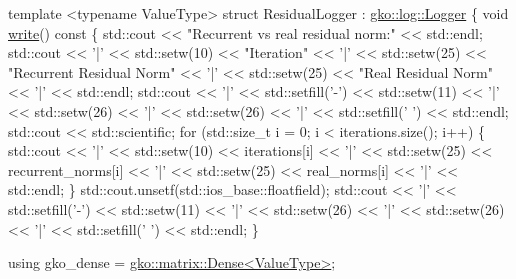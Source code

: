 \begin{DoxyCodeInclude}
\textcolor{keyword}{template} <\textcolor{keyword}{typename} ValueType>
\textcolor{keyword}{struct }ResidualLogger : \hyperlink{classgko_1_1log_1_1Logger}{gko::log::Logger} \{
    \textcolor{keywordtype}{void} \hyperlink{namespacegko_a859dc47a462721d83728d91ab7fa2148}{write}()\textcolor{keyword}{ const}
\textcolor{keyword}{    }\{
        std::cout << \textcolor{stringliteral}{"Recurrent vs real residual norm:"} << std::endl;
        std::cout << \textcolor{charliteral}{'|'} << std::setw(10) << \textcolor{stringliteral}{"Iteration"} << \textcolor{charliteral}{'|'} << std::setw(25)
                  << \textcolor{stringliteral}{"Recurrent Residual Norm"} << \textcolor{charliteral}{'|'} << std::setw(25)
                  << \textcolor{stringliteral}{"Real Residual Norm"} << \textcolor{charliteral}{'|'} << std::endl;
        std::cout << \textcolor{charliteral}{'|'} << std::setfill(\textcolor{charliteral}{'-'}) << std::setw(11) << \textcolor{charliteral}{'|'}
                  << std::setw(26) << \textcolor{charliteral}{'|'} << std::setw(26) << \textcolor{charliteral}{'|'}
                  << std::setfill(\textcolor{charliteral}{' '}) << std::endl;
        std::cout << std::scientific;
        \textcolor{keywordflow}{for} (std::size\_t i = 0; i < iterations.size(); i++) \{
            std::cout << \textcolor{charliteral}{'|'} << std::setw(10) << iterations[i] << \textcolor{charliteral}{'|'}
                      << std::setw(25) << recurrent\_norms[i] << \textcolor{charliteral}{'|'}
                      << std::setw(25) << real\_norms[i] << \textcolor{charliteral}{'|'} << std::endl;
        \}
        std::cout.unsetf(std::ios\_base::floatfield);
        std::cout << \textcolor{charliteral}{'|'} << std::setfill(\textcolor{charliteral}{'-'}) << std::setw(11) << \textcolor{charliteral}{'|'}
                  << std::setw(26) << \textcolor{charliteral}{'|'} << std::setw(26) << \textcolor{charliteral}{'|'}
                  << std::setfill(\textcolor{charliteral}{' '}) << std::endl;
    \}

    \textcolor{keyword}{using} gko\_dense = \hyperlink{classgko_1_1matrix_1_1Dense}{gko::matrix::Dense<ValueType>};


\end{DoxyCodeInclude}
